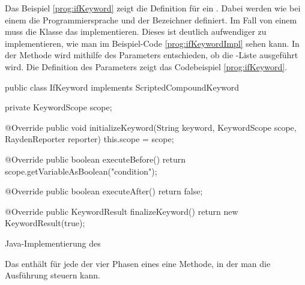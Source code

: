 \SuperPar
Das Beispiel \ref{prog:ifKeyword} zeigt die Definition für ein . Dabei werden wie bei einem  die Programmiersprache und der Bezeichner definiert. Im Fall von einem  muss die Klasse das   implementieren. Dieses  ist deutlich aufwendiger zu implementieren, wie man im Beispiel-Code \ref{prog:ifKeywordImpl} sehen kann. In der Methode  wird mithilfe des Parameters  entschieden, ob die -Liste ausgeführt wird. Die Definition des Parameters  zeigt das Codebeispiel \ref{prog:ifKeyword}. 

\begin{program}
\begin{JavaCode}
public class IfKeyword implements ScriptedCompoundKeyword {

  private KeywordScope scope;

  @Override
  public void initializeKeyword(String keyword, 
	  KeywordScope scope, RaydenReporter reporter) {
    this.scope = scope;
  }

  @Override
  public boolean executeBefore() {
    return scope.getVariableAsBoolean("condition");
  }

  @Override
  public boolean executeAfter() {
    return false;
  }
  
  @Override
  public KeywordResult finalizeKeyword() {
    return new KeywordResult(true);
  }
	
}
\end{JavaCode}
\caption{Java-Implementierung des }
\label{prog:ifKeywordImpl}
\end{program}

\SuperPar
Das  enthält für jede der vier Phasen eines  eine Methode, in der man die Ausführung steuern kann. \\

